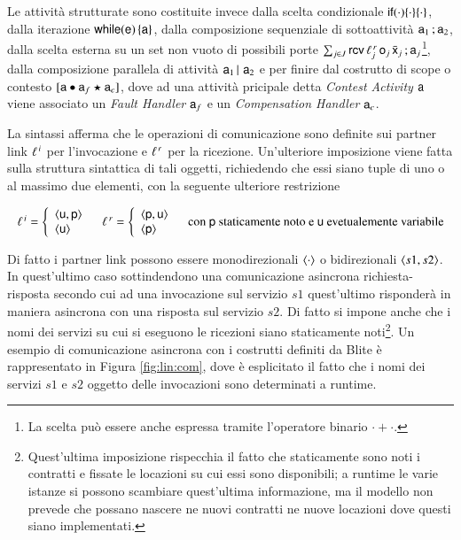 Le attività strutturate sono costituite invece dalla scelta condizionale
${\sf if}(\cdot)\{ \cdot \}\{\cdot\}$, dalla iterazione ${\sf while}({\sf e})\, \{ {\sf a}\}$, dalla
composizione sequenziale di sottoattività ${\sf a}_1\, ;{\sf a}_2$, dalla scelta
esterna su un set non vuoto di possibili porte $\sum_{j \in
J}{\sf rcv}\,\ell^{\,r}_j\, {\sf o}_j\, \bar{{\sf x}}_j\, ;{\sf a}_j$\footnote{La scelta può
essere anche espressa tramite l'operatore binario $ \cdot + \cdot$.}, dalla
composizione parallela di attività ${\sf a}_1\,|\,\, {\sf a}_2$ e per finire dal costrutto di scope o contesto $[{\sf a} \bullet {\sf a}_f \star {\sf a}_c]$, dove ad una attività pricipale
detta \emph{Contest Activity} ${\sf a}$ viene associato un \emph{Fault Handler}
${\sf a}_f$ e un \emph{Compensation Handler} ${\sf a}_c$.

La sintassi afferma che le operazioni di comunicazione sono
definite sui partner link $\ell^{\,i}$ per l'invocazione e $\ell^{\,r}$ per la
ricezione. Un'ulteriore imposizione viene fatta sulla struttura sintattica di
tali oggetti, richiedendo che essi siano tuple di uno o al massimo due elementi,
con la seguente ulteriore restrizione

$$
\begin{array}{ccc}

\plinv = \left\{ 
\begin{array}{l}
 \arr{\xu,\xp}   \\
 \arr{\xu}  
\end{array} \right.

&

\plrec = \left\{ 
\begin{array}{l}
 \arr{\xp,\xu}   \\
 \arr{\xp}  
\end{array} \right.

& \textrm{con } \xp \textrm{ staticamente noto e } \xu \textrm{
evetualemente variabile}

\end{array}
$$

Di fatto i partner link possono essere monodirezionali $\langle \cdot \rangle$ o
bidirezionali $\langle s1, s2 \rangle$. In quest'ultimo caso sottindendono una
comunicazione asincrona richiesta-risposta secondo cui ad una invocazione sul servizio $s1$
quest'ultimo risponderà in maniera asincrona con una risposta sul servizio $s2$.
Di fatto si impone anche che i nomi dei servizi su cui si eseguono le ricezioni
siano staticamente noti\footnote{Quest'ultima imposizione rispecchia il
fatto che staticamente sono noti i contratti e fissate le
locazioni su cui essi sono disponibili; a runtime le varie istanze si possono
scambiare quest'ultima informazione, ma il modello non prevede che possano
nascere ne nuovi contratti ne nuove locazioni dove questi siano implementati.}.
Un esempio di comunicazione asincrona con i costrutti definiti da Blite è
rappresentato in Figura \ref{fig:lin:com}, dove è esplicitato il fatto che i
nomi dei servizi $s1$ e $s2$ oggetto delle invocazioni sono determinati a
runtime.

